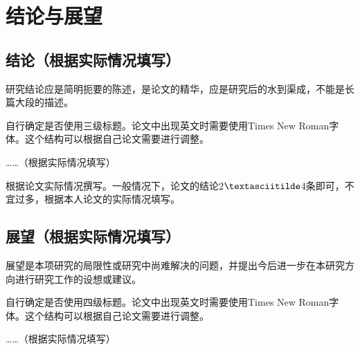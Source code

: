 \chapter{结论与展望}

\section{结论（根据实际情况填写）}
研究结论应是简明扼要的陈述，是论文的精华，应是研究后的水到渠成，不能是长篇大段的描述。

自行确定是否使用三级标题。论文中出现英文时需要使用Times New Roman字体。这个结构可以根据自己论文需要进行调整。

……（根据实际情况填写）

根据论文实际情况撰写。一般情况下，论文的结论2$\textasciitilde$4条即可，不宜过多，根据本人论文的实际情况填写。



\section{展望（根据实际情况填写）}

展望是本项研究的局限性或研究中尚难解决的问题，并提出今后进一步在本研究方向进行研究工作的设想或建议。

自行确定是否使用四级标题。论文中出现英文时需要使用Times New Roman字体。这个结构可以根据自己论文需要进行调整。

……（根据实际情况填写）

